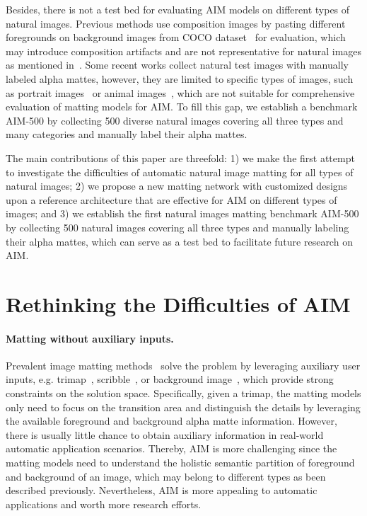\documentclass{article}
\begin{document}
Besides, there is not a test bed for evaluating AIM models on different types of natural images. Previous methods use composition images by pasting different foregrounds on background images from  COCO dataset~\cite{lin2014microsoft} for evaluation, which may introduce composition artifacts and are not representative for natural images as mentioned in~\cite{gfm}. Some recent works collect natural test images with manually labeled alpha mattes, however, they are limited to specific types of images, such as portrait images~\cite{MODNet} or animal images~\cite{gfm}, which are not suitable for comprehensive evaluation of matting models for AIM. To fill this gap, we establish a benchmark AIM-500 by collecting 500 diverse natural images covering all three types and many categories and manually label their alpha mattes.
 
The main contributions of this paper are threefold: 1) we make the first attempt to investigate the difficulties of automatic natural image matting for all types of natural images; 2) we propose a new matting network with customized designs upon a reference architecture that are effective for AIM on different types of images; and 3) we establish the first natural images matting benchmark AIM-500 by collecting 500 natural images covering all three types and manually labeling their alpha mattes, which can serve as a test bed to facilitate future research on AIM.



\section{Rethinking the Difficulties of AIM}

\label{sec:rethinking}

\paragraph{Matting without auxiliary inputs.}Prevalent image matting methods~\cite{sim,cho2016natural} solve the problem by leveraging auxiliary user inputs, e.g. trimap~\cite{tang2019learning}, scribble~\cite{levin2007closed}, or background image~\cite{backgroundmatting}, which provide strong constraints on the solution space. Specifically, given a trimap, the matting models only need to focus on the transition area and distinguish the details by leveraging the available foreground and background alpha matte information. However, there is usually little chance to obtain auxiliary information in real-world automatic application scenarios. Thereby, AIM is more challenging since the matting models need to understand the holistic semantic partition of foreground and background of an image, which may belong to different types as been described previously. Nevertheless, AIM is more appealing to automatic applications and worth more research efforts.
\end{document}
